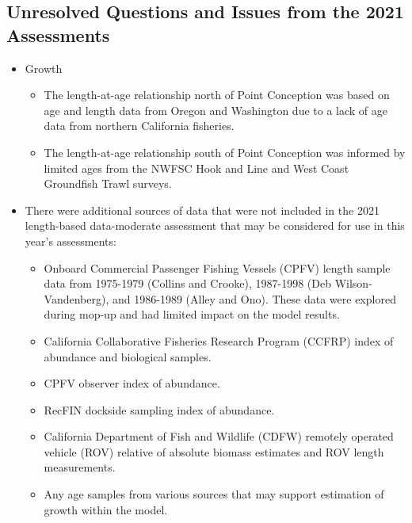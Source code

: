 \documentclass[
]{article}
\providecommand{\tightlist}{%
  \setlength{\itemsep}{0pt}\setlength{\parskip}{0pt}}
\begin{document}
\hypertarget{unresolved-questions-and-issues-from-the-2021-assessments}{%
\subsection{Unresolved Questions and Issues from the 2021
Assessments}\label{unresolved-questions-and-issues-from-the-2021-assessments}}

\begin{itemize}
\tightlist
\item
  Growth

  \begin{itemize}
  \tightlist
  \item
    The length-at-age relationship north of Point Conception was based
    on age and length data from Oregon and Washington due to a lack of
    age data from northern California fisheries.
  \item
    The length-at-age relationship south of Point Conception was
    informed by limited ages from the NWFSC Hook and Line and West Coast
    Groundfish Trawl surveys.
  \end{itemize}
\item
  There were additional sources of data that were not included in the
  2021 length-based data-moderate assessment that may be considered for
  use in this year's assessments:

  \begin{itemize}
  \tightlist
  \item
    Onboard Commercial Passenger Fishing Vessels (CPFV) length sample
    data from 1975-1979 (Collins and Crooke), 1987-1998 (Deb
    Wilson-Vandenberg), and 1986-1989 (Alley and Ono). These data were
    explored during mop-up and had limited impact on the model results.
  \item
    California Collaborative Fisheries Research Program (CCFRP) index of
    abundance and biological samples.
  \item
    CPFV observer index of abundance.
  \item
    RecFIN dockside sampling index of abundance.
  \item
    California Department of Fish and Wildlife (CDFW) remotely operated
    vehicle (ROV) relative of absolute biomass estimates and ROV length
    measurements.
  \item
    Any age samples from various sources that may support estimation of
    growth within the model.
  \end{itemize}
\end{itemize}
\end{document}

